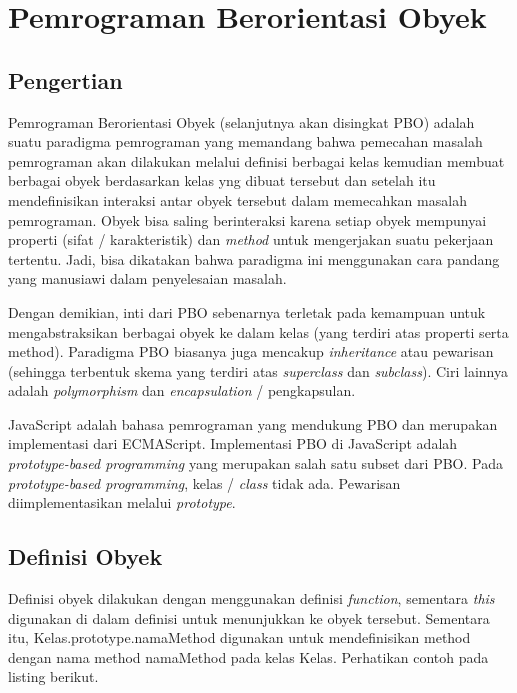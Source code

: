 \section{Pemrograman Berorientasi Obyek}

\subsection{Pengertian}

Pemrograman Berorientasi Obyek (selanjutnya akan disingkat PBO) adalah suatu paradigma pemrograman yang memandang bahwa pemecahan masalah pemrograman akan dilakukan melalui definisi berbagai kelas kemudian membuat berbagai obyek berdasarkan kelas yng dibuat tersebut dan setelah itu mendefinisikan interaksi antar obyek tersebut dalam memecahkan masalah pemrograman. Obyek bisa saling berinteraksi karena setiap obyek mempunyai properti (sifat / karakteristik) dan \textit{method} untuk mengerjakan suatu pekerjaan tertentu. Jadi, bisa dikatakan bahwa paradigma ini menggunakan cara pandang yang manusiawi dalam penyelesaian masalah.

Dengan demikian, inti dari PBO sebenarnya terletak pada kemampuan untuk mengabstraksikan berbagai obyek ke dalam kelas (yang terdiri atas properti serta method). Paradigma PBO biasanya juga mencakup \textit{inheritance} atau pewarisan (sehingga terbentuk skema yang terdiri atas \textit{superclass} dan \textit{subclass}). Ciri lainnya adalah \textit{polymorphism} dan \textit{encapsulation} / pengkapsulan.

JavaScript adalah bahasa pemrograman yang mendukung PBO dan merupakan implementasi dari ECMAScript. Implementasi PBO di JavaScript adalah \textit{prototype-based programming} yang merupakan salah satu subset dari PBO. Pada \textit{prototype-based programming}, kelas / \textit{class} tidak ada. Pewarisan diimplementasikan melalui \textit{prototype}.

\subsection{Definisi Obyek}

Definisi obyek dilakukan dengan menggunakan definisi \textit{function}, sementara \textit{this} digunakan di dalam definisi untuk menunjukkan ke obyek tersebut. Sementara itu, Kelas.prototype.namaMethod digunakan untuk mendefinisikan method dengan nama method namaMethod pada kelas Kelas. Perhatikan contoh pada listing berikut.

